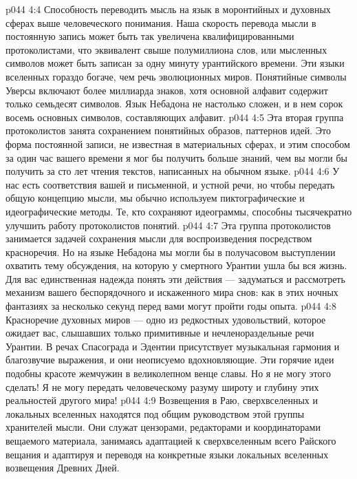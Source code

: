 \vs p044 4:4 Способность переводить мысль на язык в моронтийных и духовных сферах выше человеческого понимания. Наша скорость перевода мысли в постоянную запись может быть так увеличена квалифицированными протоколистами, что эквивалент свыше полумиллиона слов, или мысленных символов может быть записан за одну минуту урантийского времени. Эти языки вселенных гораздо богаче, чем речь эволюционных миров. Понятийные символы Уверсы включают более миллиарда знаков, хотя основной алфавит содержит только семьдесят символов. Язык Небадона не настолько сложен, и в нем сорок восемь основных символов, составляющих алфавит.
\vs p044 4:5 \pc {}\bibnobreakspace {} Эта вторая группа протоколистов занята сохранением понятийных образов, паттернов идей. Это форма постоянной записи, не известная в материальных сферах, и этим способом за один час вашего времени я мог бы получить больше знаний, чем вы могли бы получить за сто лет чтения текстов, написанных на обычном языке.
\vs p044 4:6 \pc {}\bibnobreakspace {} У нас есть соответствия вашей и письменной, и устной речи, но чтобы передать общую концепцию мысли, мы обычно используем пиктографические и идеографические методы. Те, кто сохраняют идеограммы, способны тысячекратно улучшить работу протоколистов понятий.
\vs p044 4:7 \pc {}\bibnobreakspace {} Эта группа протоколистов занимается задачей сохранения мысли для воспроизведения посредством красноречия. Но на языке Небадона мы могли бы в получасовом выступлении охватить тему обсуждения, на которую у смертного Урантии ушла бы вся жизнь. Для вас единственная надежда понять эти действия --- задуматься и рассмотреть механизм вашего беспорядочного и искаженного мира снов: как в этих ночных фантазиях за несколько секунд перед вами могут пройти годы опыта.
\vs p044 4:8 Красноречие духовных миров --- одно из редкостных удовольствий, которое ожидает вас, слышавших только примитивные и нечленораздельные речи Урантии. В речах Спасограда и Эдентии присутствует музыкальная гармония и благозвучие выражения, и они неописуемо вдохновляющие. Эти горячие идеи подобны красоте жемчужин в великолепном венце славы. Но я не могу этого сделать! Я не могу передать человеческому разуму широту и глубину этих реальностей другого мира!
\vs p044 4:9 \pc {}\bibnobreakspace {} Возвещения в Раю, сверхвселенных и локальных вселенных находятся под общим руководством этой группы хранителей мысли. Они служат цензорами, редакторами и координаторами вещаемого материала, занимаясь адаптацией к сверхвселенным всего Райского вещания и адаптируя и переводя на конкретные языки локальных вселенных возвещения Древних Дней.
